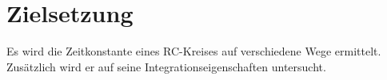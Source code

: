 \section{Zielsetzung}
\label{sec:Zielsetzung}
Es wird die Zeitkonstante eines RC-Kreises auf verschiedene Wege ermittelt.
Zusätzlich wird er auf seine Integrationseigenschaften untersucht. 
